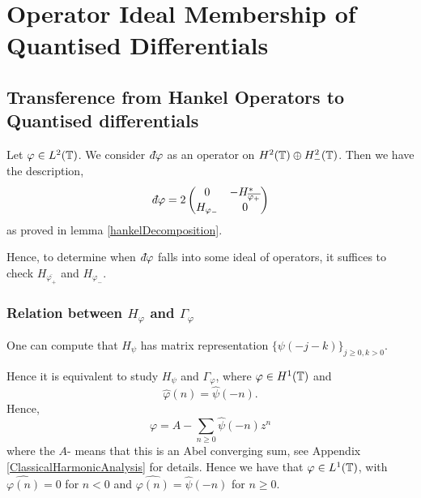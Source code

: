 
\chapter{Operator Ideal Membership of Quantised Differentials} %

\label{IdealMembership} %


\section{Transference from Hankel Operators to Quantised differentials}
Let $\varphi \in L^2(\mathbb{T})$. We consider $\qd \varphi$
as an operator on $H^2(\mathbb{T})\oplus H^2_-(\mathbb{T})$. Then we have the description,
\begin{equation}
\label{quantumMatrix}
    \qd \varphi = 2\begin{pmatrix}
        0 & -H_{\overline{\varphi_+}}^*\\
        H_{\varphi_-}  & 0
    \end{pmatrix}
\end{equation}
as proved in lemma \ref{hankelDecomposition}.


Hence, to determine when $\qd \varphi$ falls into some ideal of operators,
it suffices to check $H_{\overline{\varphi_+}}$ and $H_{\varphi_-}$.


\subsection{Relation between $H_\varphi$ and $\Gamma_\varphi$}
One can compute that $H_\psi$ has matrix representation $\{\psi(-j-k)\}_{j\geq 0,k > 0}$.

Hence it is equivalent to study $H_\psi$ and $\Gamma_\varphi$, where $\varphi \in H^1(\mathbb{T})$
and
\begin{equation}
    \hat{\varphi}(n) = \hat{\psi}(-n).
\end{equation}
Hence,
\begin{equation}
    \varphi = A-\sum_{n\geq 0} \hat{\psi}(-n)z^n
\end{equation}
where the $A$- means that this is an Abel converging sum, see Appendix \ref{ClassicalHarmonicAnalysis}
for details. Hence we have that $\varphi \in L^1(\mathbb{T})$, with $\hat{\varphi(n)} = 0$
for $n < 0$ and $\hat{\varphi(n)} = \hat{\psi}(-n)$ for $n\geq 0$.

